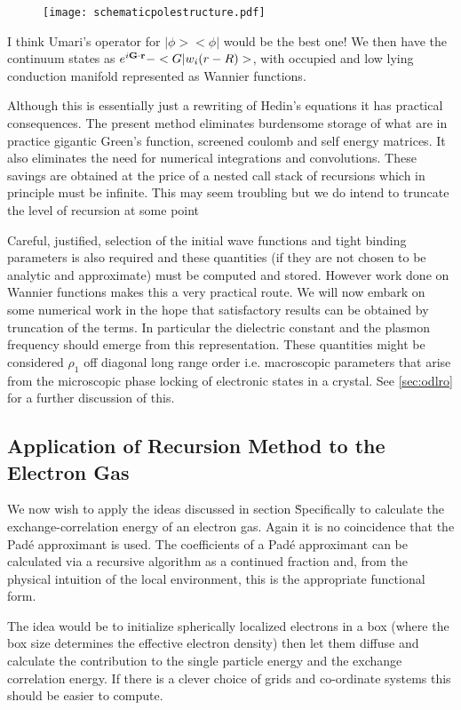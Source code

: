 \documentclass{article}
\def\G{{\bf G}}
\def\r{{\bf r}}
\begin{document}
\begin{figure}
\texttt{[image: schematicpolestructure.pdf]}
\end{figure}

I think Umari's operator for $|\phi><\phi|$ would be the best one!
We then have the continuum states as $e^{i\G\cdot\r}-<G|w_{i}(r-R)>$,
with occupied and low lying conduction manifold represented as Wannier 
functions.

	Although this is essentially just a rewriting of Hedin's equations
it has practical consequences. The present method eliminates
burdensome storage of what are in practice gigantic Green's function, 
screened coulomb and self energy matrices. It also eliminates the need for 
numerical integrations and convolutions. These savings are
obtained at the price of a nested call stack of recursions which 
in principle must be infinite. This may seem troubling but we do intend to truncate
the level of recursion at some point 

	Careful, justified, selection of the initial wave functions and tight binding parameters
is also required and these quantities (if they are not chosen to be analytic and approximate)
must be computed and stored. However work done on Wannier functions makes this a very
practical route. We will now embark on some numerical work in the hope that satisfactory 
results can be obtained by truncation of the terms. In particular the dielectric constant
and the plasmon frequency should emerge from this representation. These quantities
might be considered $\rho_{1}$ off diagonal long range order i.e. macroscopic parameters
that arise from the microscopic phase locking of electronic states in a crystal. See
\ref{sec:odlro} for a further discussion of this.

\subsection{Application of Recursion Method to the Electron Gas}
	We now wish to apply the ideas discussed in section \. Specifically to 
calculate the exchange-correlation energy of an electron gas. Again it is 
no coincidence that the Pad\'e approximant is used. The coefficients
of a Pad\'e approximant can be calculated via a recursive algorithm
as a continued fraction \cite{vidbergserene} and, from the physical
intuition of the local environment, this is the appropriate functional form.

The idea would be to initialize spherically localized electrons in a box 
(where the box size determines the effective electron density)
then let them diffuse and calculate the contribution to the
single particle energy and the exchange correlation energy. 
If there is a clever choice of grids and co-ordinate systems this
should be easier to compute.
\end{document}
